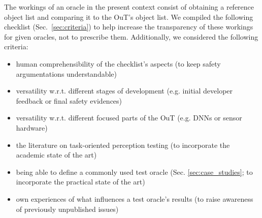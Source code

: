 \documentclass[conference]{IEEEtran}
\begin{document}
The workings of an oracle in the present context consist of obtaining a reference object list and comparing it to the OuT's object list. 
We compiled the following checklist (Sec.~\ref{sec:criteria}) to help increase the transparency of these workings for given oracles, not to prescribe them.
Additionally, we considered the following criteria: %
\begin{itemize}
\item human comprehensibility of the checklist's aspects \newline (to keep safety argumentations understandable)
\item versatility w.r.t. different stages of development \newline (e.g. initial developer feedback or final safety evidences)
\item versatility w.r.t. different focused parts of the OuT \newline (e.g. DNNs or sensor hardware)
\item the literature on task-oriented perception testing \newline (to incorporate the academic state of the art)
\item being able to define a commonly used test oracle \newline (Sec. \ref{sec:case_studies}; to incorporate the practical state of the art)
\item own experiences of what influences a test oracle's results
(to raise awareness of previously unpublished issues)


\end{itemize}



\end{document}
